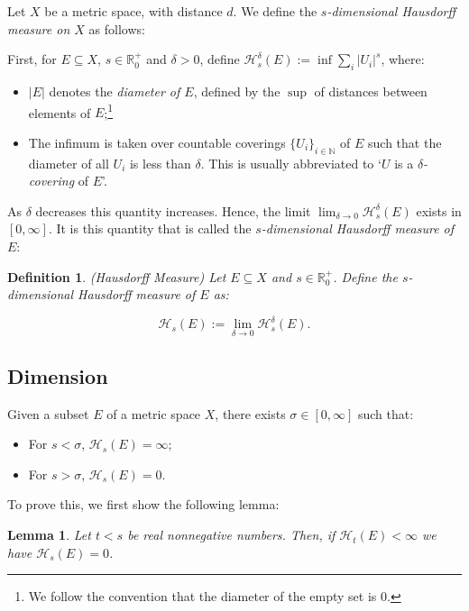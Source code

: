 \documentclass[11pt, reqno]{amsart}
\newcommand{\R}{\mathbb{R}}
\newcommand{\N}{\mathbb{N}}
\newcommand{\HH}{\mathcal{H}}
\newtheorem{lemma}{Lemma}
\newtheorem{definition}{Definition}
\begin{document}
Let $X$ be a metric space, with distance $d$. We define the \emph{$s$-dimensional Hausdorff measure on $X$} as follows:

First, for $E \subseteq X$, $s \in \R^+_0$ and $\delta > 0$, define $\HH_s^\delta(E) := \inf \sum_i \lvert U_i \rvert^s$, where:

\begin{itemize}

\item $\lvert E \rvert$ denotes the \emph{diameter of $E$}, defined by the $\sup$ of distances between elements of $E$;\footnote{We follow the convention that the diameter of the empty set is 0.}

\item The infimum is taken over countable coverings $\{U_i\}_{i \in \N}$ of $E$ such that the diameter of all $U_i$ is less than $\delta$. This is usually abbreviated to `$U$ is a \emph{$\delta$-covering} of $E$'.

\end{itemize}

As $\delta$ decreases this quantity increases. Hence, the limit $\lim_{\delta \to 0} \HH_s^\delta(E)$ exists in $\left[ 0, \infty \right]$. It is this quantity that is called the \emph{$s$-dimensional Hausdorff measure of $E$}:

\begin{definition}(Hausdorff Measure) Let $E \subseteq X$ and $s \in \R^+_0$. Define the $s$-dimensional Hausdorff measure of $E$ as:

 \[\HH_s(E) := \lim_{\delta \to 0} \HH_s^\delta(E).\]
\end{definition}

\subsection{Dimension}

Given a subset $E$ of a metric space $X$, there exists $\sigma \in \left[0, \infty\right]$ such that:

\begin{itemize}
\item For $s < \sigma$, $\HH_s(E) = \infty$;

\item For $s > \sigma$, $\HH_s(E) = 0$.
\end{itemize}

To prove this, we first show the following lemma:

\begin{lemma}\label{helperdimension}
Let $t < s$ be real nonnegative numbers. Then, if $\HH_t(E) < \infty$ we have $\HH_s(E) = 0$.
\end{lemma}
\end{document}
